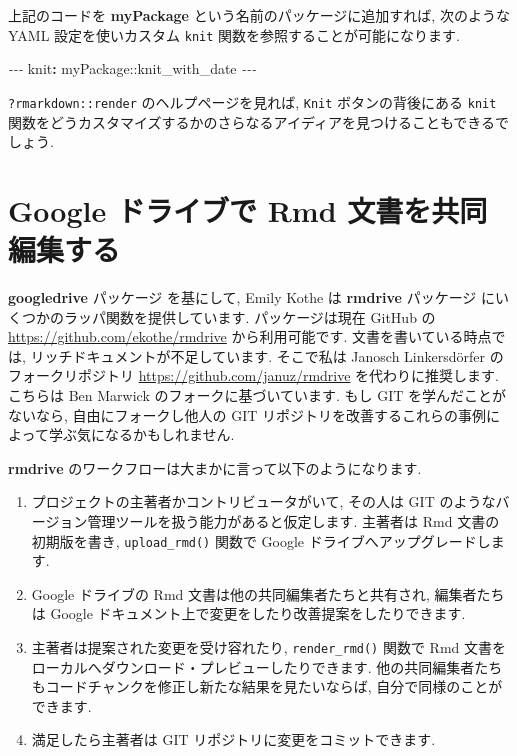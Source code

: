 \documentclass[
  11pt,
]{bxjsreport}
\newenvironment{Shaded}{\begin{snugshade}}{\end{snugshade}}
\newcommand{\AttributeTok}[1]{\textcolor[rgb]{0.77,0.63,0.00}{#1}}
\newcommand{\FunctionTok}[1]{\textcolor[rgb]{0.00,0.00,0.00}{#1}}
\newcommand{\KeywordTok}[1]{\textcolor[rgb]{0.13,0.29,0.53}{\textbf{#1}}}
\newcommand{\PreprocessorTok}[1]{\textcolor[rgb]{0.56,0.35,0.01}{\textit{#1}}}
\begin{document}
上記のコードを \textbf{myPackage} という名前のパッケージに追加すれば, 次のような YAML 設定を使いカスタム \texttt{knit} 関数を参照することが可能になります.

\begin{Shaded}
\begin{Highlighting}[]
\PreprocessorTok{{-}{-}{-}}
\FunctionTok{knit}\KeywordTok{:}\AttributeTok{ myPackage::knit\_with\_date}
\PreprocessorTok{{-}{-}{-}}
\end{Highlighting}
\end{Shaded}

\texttt{?rmarkdown::render} のヘルプページを見れば, \texttt{Knit} ボタンの背後にある \texttt{knit} 関数をどうカスタマイズするかのさらなるアイディアを見つけることもできるでしょう.

\hypertarget{google-drive}{%
\section{Google ドライブで Rmd 文書を共同編集する}\label{google-drive}}

\textbf{googledrive} パッケージ \autocite{R-googledrive} を基にして, Emily Kothe は \textbf{rmdrive} パッケージ にいくつかのラッパ関数を提供しています. パッケージは現在 GitHub の \url{https://github.com/ekothe/rmdrive} から利用可能です. 文書を書いている時点では, リッチドキュメントが不足しています. そこで私は Janosch Linkersdörfer のフォークリポジトリ \url{https://github.com/januz/rmdrive} を代わりに推奨します. こちらは Ben Marwick のフォークに基づいています. もし GIT を学んだことがないなら, 自由にフォークし他人の GIT リポジトリを改善するこれらの事例によって学ぶ気になるかもしれません.

\textbf{rmdrive} のワークフローは大まかに言って以下のようになります.

\begin{enumerate}
\def\labelenumi{\arabic{enumi}.}
\item
  プロジェクトの主著者かコントリビュータがいて, その人は GIT のようなバージョン管理ツールを扱う能力があると仮定します. 主著者は Rmd 文書の初期版を書き, \texttt{upload\_rmd()} 関数で Google ドライブへアップグレードします.
\item
  Google ドライブの Rmd 文書は他の共同編集者たちと共有され, 編集者たちは Google ドキュメント上で変更をしたり改善提案をしたりできます.
\item
  主著者は提案された変更を受け容れたり, \texttt{render\_rmd()} 関数で Rmd 文書をローカルへダウンロード・プレビューしたりできます. 他の共同編集者たちもコードチャンクを修正し新たな結果を見たいならば, 自分で同様のことができます.
\item
  満足したら主著者は GIT リポジトリに変更をコミットできます.
\end{enumerate}
\end{document}
